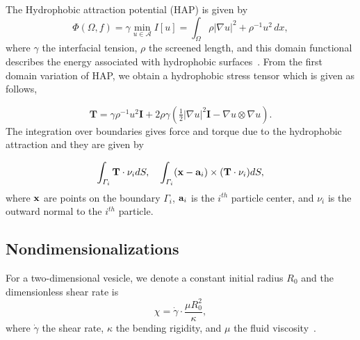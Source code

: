 \documentclass[lineno]{jfm}
\begin{document}
The Hydrophobic attraction potential (HAP) is given by
\begin{equation}
\label{eq:main}
\Phi(\Omega,f) = \gamma  \min_{u \in \mathcal{A}}
 I[u]  = \int_{\Omega} \rho |\nabla u|^2 + \rho^{-1} u^2 \,dx,
\end{equation}
%
where $\gamma$ the interfacial tension, $\rho$ the screened length, and this domain functional describes the energy associated with hydrophobic surfaces~\cite{Fu20}. From the first domain variation of HAP, we obtain a hydrophobic stress tensor which is given as follows, 

\begin{equation}
\label{eq:stress}
\mathbf{T}
= \gamma\rho^{-1}u^2 \mathbf{I} + 2\rho\gamma (\tfrac{1}{2}|\nabla u|^2 \mathbf{I} - \nabla u\otimes \nabla u).
\end{equation}
%
The integration over boundaries gives force and torque due to the hydrophobic attraction and they are given by 

\begin{equation}
\int_{\Gamma_i} {\bf T}\cdot \nu_i dS ,\quad \int_{\Gamma_i} ({\bf x}-{\bf a}_i)\times ({\bf T}\cdot \nu_i) dS,
\end{equation}
%
where ${\bf x}$ are points on the boundary $\Gamma_i$, ${\bf a}_i$ is the $i^{th}$ particle center, and $\nu_i$ is the outward normal to the $i^{th}$ particle.



\subsection{Nondimensionalizations}



For a two-dimensional vesicle, we denote a constant initial radius $R_0$ and 
the dimensionless shear rate is
\begin{equation}
\chi = \dot\gamma \cdot\frac{\mu R_0^2}{\kappa},
\end{equation}
%
where $\dot\gamma$ the shear rate, $\kappa$ the bending rigidity, and $\mu$ the fluid viscosity~\cite{Finken08}.
\end{document}
